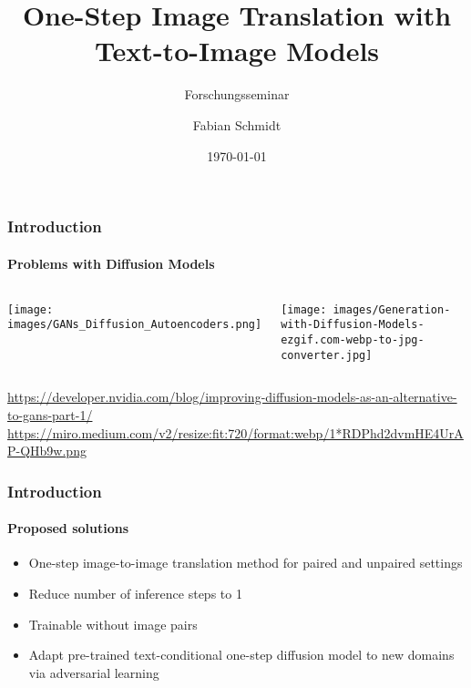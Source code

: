 \documentclass[aspectratio=169, lecture, amberg]{OTHAWbeamer}
\title[Forschungsseminar]{One-Step Image Translation with Text-to-Image Models}
\subtitle{Forschungsseminar}
\author[Schmidt]{Fabian Schmidt}
\date{\today}
\begin{document}
\maketitle

\begin{frame}
\frametitle{Introduction}
\framesubtitle{Problems with Diffusion Models}

\begin{columns}
    \centering
    \texttt{[image: images/GANs\_Diffusion\_Autoencoders.png]}

    \centering
    \texttt{[image: images/Generation-with-Diffusion-Models-ezgif.com-webp-to-jpg-converter.jpg]}
  \end{columns}  
  \tiny{\footnotemark \url{https://developer.nvidia.com/blog/improving-diffusion-models-as-an-alternative-to-gans-part-1/}}
  \tiny{\footnotemark \url{https://miro.medium.com/v2/resize:fit:720/format:webp/1*RDPhd2dvmHE4UrAP-QHb9w.png}}
\end{frame}

\begin{frame}
\frametitle{Introduction}
\framesubtitle{Proposed solutions}
\begin{itemize}
    \item One-step image-to-image translation method for paired and unpaired settings
    \item Reduce number of inference steps to 1
    \item Trainable without image pairs
    \item Adapt pre-trained text-conditional one-step diffusion model to new domains via adversarial learning
\end{itemize}
\end{frame}
\end{document}
